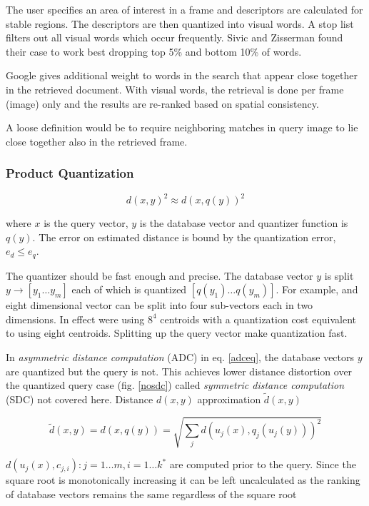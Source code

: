\documentclass[english,12pt,a4paper,pdftex,elec,utf8, table]{aaltothesis}
\begin{document}
The user specifies an area of interest in a frame and descriptors are calculated for stable regions. The descriptors are then quantized into visual words. A stop list filters out all visual words which occur frequently. Sivic and Zisserman found their case to work best dropping top 5\% and bottom 10\% of words.

Google gives additional weight to words in the search that appear close together in the retrieved document. With visual words, the retrieval is done per frame (image) only and the results are re-ranked based on spatial consistency.

A loose definition would be to require neighboring matches in query image to lie close together also in the retrieved frame.

\subsubsection{Product Quantization} \label{PQ}

\begin{equation}
  \label{quantizereq}
d(x,y)^2 \approx d(x,q(y))^2
\end{equation}

where $x$ is the query vector, $y$ is the database vector and quantizer function is $q(y)$. The error on estimated distance is bound by the quantization error, $e_d \leq e_q$.  \cite{Jegou2014}

The quantizer should be fast enough and precise. The database vector $y$ is split $y \rightarrow [y_1 \ldots y_m]$ each of which is quantized $[q(y_1)\ldots q(y_m)]$. For example, and eight dimensional vector can be split into four sub-vectors each in two dimensions. In effect were using $8^4$ centroids with a quantization cost equivalent to using eight centroids. Splitting up the query vector make quantization fast. \cite{Jegou2014}

In \emph{asymmetric distance computation} (ADC) in eq. \ref{adceq}, the database vectors $y$ are quantized but the query is not. This achieves lower distance distortion over the quantized query case (fig. \ref{nosdc}) called \emph{symmetric distance computation} (SDC) not covered here. Distance $d(x,y)$ approximation $\tilde{d}(x,y)$

\begin{equation}
  \label{adceq}
  \tilde{d}(x,y)=d(x, q(y))=\sqrt{\sum_jd(u_j(x),q_j(u_j(y)))^2}
\end{equation}

$d(u_j(x),c_{j,i}) : j = 1\ldots m,i=1\ldots k^*$ are computed prior to the query. Since the square root is monotonically increasing it can be left uncalculated as the ranking of database vectors remains the same regardless of the square root\cite{Jegou2011}
\end{document}
